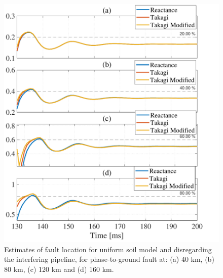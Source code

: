 \documentclass[conference]{IEEEtran}
\begin{document}
\begin{figure}[hbt]
	\begin{center}
		\includegraphics[width=1.1\columnwidth]{./fig/FaultInterfError.pdf}
		\caption{Estimates of fault location for uniform soil model and disregarding the interfering pipeline, for phase-to-ground fault at: (a) 40 km, (b) 80 km, (c) 120 km and (d) 160 km.}
		\label{fig:ConvUniform_NoInterf}
	\end{center}
\end{figure}
\end{document}
